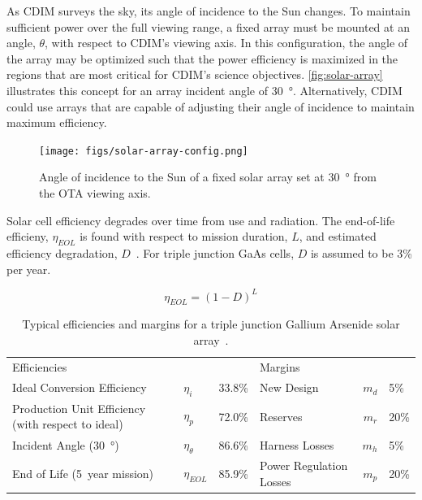 \documentclass{ws-jai}
\begin{document}
As CDIM surveys the sky, its angle of incidence to the Sun changes.
To maintain sufficient power over the full viewing range, a fixed array must be mounted at an angle, $\theta$, with respect to CDIM's viewing axis.
In this configuration, the angle of the array may be optimized such that the power efficiency is maximized in the regions that are most critical for CDIM's science objectives.
\autoref{fig:solar-array} illustrates this concept for an array incident angle of \SI{30}{\degree}.
Alternatively, CDIM could use arrays that are capable of adjusting their angle of incidence to maintain maximum efficiency.

\begin{figure}[hb]
  \centering
  \texttt{[image: figs/solar-array-config.png]}
  \caption{Angle of incidence to the Sun of a fixed solar array set at \SI{30}{\degree} from the OTA viewing axis.}
\label{fig:solar-array}
\end{figure}

Solar cell efficiency degrades over time from use and radiation.
The end-of-life efficieny, $\eta_{EOL}$ is found with respect to mission duration, $L$, and estimated efficiency degradation, $D$~\cite{smad2015}.
For triple junction GaAs cells, $D$ is assumed to be 3\% per year.

\begin{equation}
  \eta_{EOL} = {(1-D)}^L
\end{equation}

\begin{table}[!ht]
  \centering
  \caption{Typical efficiencies and margins for a triple junction Gallium Arsenide solar array~\cite{smad2015}.
\label{tab:solar-array}
  }
  \begin{tabular}{@{}llrlr@{}}\toprule
    Efficiencies &&  & Margins & & \\ \cmidrule(r){1-3} \cmidrule(l){4-6}
    Ideal Conversion Efficiency & $\eta_{i}$ & 33.8\% & New Design & $m_d$ & 5\%  \\
    Production Unit Efficiency (with respect to ideal) & $\eta_{p}$  & 72.0\% & Reserves & $m_r$ & 20\% \\
    Incident Angle (\SI{30}{\degree}) & $\eta_{\theta}$ & 86.6\% & Harness Losses & $m_h$ &5\% \\
    End of Life (\SI{5}{year} mission) & $\eta_{EOL}$ & 85.9\% & Power Regulation Losses &  $m_p$ & 20\% \\ \bottomrule
  \end{tabular}
\end{table}
\end{document}
